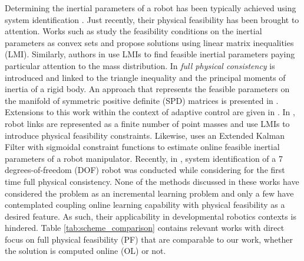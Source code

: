 Determining the inertial parameters of a robot has been typically achieved using system identification \cite{Atkeson1986Estimationinertialparameters}. Just recently, their physical feasibility has been brought to attention. Works such as \cite{Sousa2014Physicalfeasibilityrobot} study the feasibility conditions on the inertial parameters as convex sets and propose solutions using linear matrix inequalities (LMI). Similarly, authors in \cite{Wensing2017Linearmatrixinequalities} use LMIs to find feasible inertial parameters paying particular attention to the mass distribution. In \cite{Traversaro2016Identificationfullyphysical} \emph{full physical consistency} is introduced and linked to the triangle inequality and the principal moments of inertia of a rigid body. An approach that represents the feasible parameters on the manifold of symmetric positive definite (SPD) matrices is presented in \cite{Lee2018geometricalgorithmrobust}. Extensions to this work within the context of adaptive control are given in \cite{Lee2018naturaladaptivecontrol}. In \cite{Ayusawa2010Identificationstandardinertial}, robot links are represented as a finite number of point masses and use LMIs to introduce physical feasibility constraints. Likewise, \cite{Joukov2015Constraineddynamicparameter} uses an Extended Kalman Filter with sigmoidal constraint functions to estimate online feasible inertial parameters of a robot manipulator. Recently, in \cite{Gaz2019Dynamicidentificationfranka}, system identification of a 7 degrees-of-freedom (DOF) robot was conducted while considering for the first time full physical consistency. None of the methods discussed in these works have considered the problem as an incremental learning problem and only a few have contemplated coupling online learning capability with physical feasibility as a desired feature. As such, their applicability in developmental robotics contexts is hindered. Table \ref{tab:scheme_comparison} contains relevant works with direct focus on full physical feasibility (PF) that are comparable to our work, whether the solution is computed online (OL) or not.

